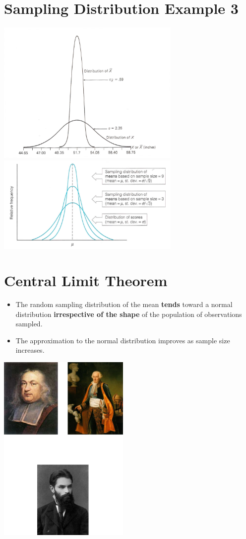 \documentclass[12pt]{article}
\begin{document}
\section{Sampling Distribution Example
3}\label{sampling-distribution-example-3}

\includegraphics[width=3.5in]{sample_dist_example.png}
\includegraphics[width=3.5in]{sample_dist_example2.png}

\section{Central Limit Theorem}\label{central-limit-theorem}

\begin{itemize}
\itemsep1pt\parskip0pt
\item
  The random sampling distribution of the mean \textbf{tends} toward a
  normal distribution \textbf{irrespective of the shape} of the
  population of observations sampled.
\item
  The approximation to the normal distribution improves as sample size
  increases. 
\end{itemize}
\includegraphics[width=2.5in]{CLT_founders.png}
\end{document}
